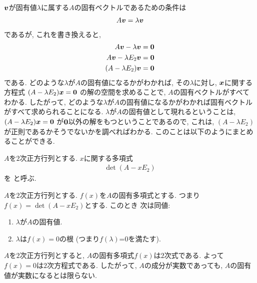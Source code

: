 $\boldsymbol{v}$が固有値$\lambda$に属する$A$の固有ベクトルであるための条件は
\begin{align*}
  A\boldsymbol{v}=\lambda\boldsymbol{v}
\end{align*}
であるが,
これを書き換えると,
\begin{align*}
  A\boldsymbol{v}-\lambda\boldsymbol{v}&=\boldsymbol{0}\\
  A\boldsymbol{v}-\lambda E_2 \boldsymbol{v}&=\boldsymbol{0}\\
  (A-\lambda E_2) \boldsymbol{v}&=\boldsymbol{0}
\end{align*}
である.
どのような$\lambda$が$A$の固有値になるかがわかれば,
その$\lambda$に対し,
$\boldsymbol{x}$に関する方程式
$(A-\lambda E_2) \boldsymbol{x}=\boldsymbol{0}$
の解の空間を求めることで,
$A$の固有ベクトルがすべてわかる.
したがって,
どのような$\lambda$が$A$の固有値になるかがわかれば固有ベクトルがすべて求められることになる.
$\lambda$が$A$の固有値として現れるということは,
$(A-\lambda E_2) \boldsymbol{x}=\boldsymbol{0}$
が$\boldsymbol{0}$以外の解をもつということであるので,
これは, $(A-\lambda E_2)$が正則であるかそうでないかを調べればわかる.
このことは以下のようにまとめることができる.
\begin{definition}
  \label{def:charpoly}
  $A$を$2$次正方行列とする.
  $x$に関する多項式
  \begin{align*}
  \det(A-xE_2)
  \end{align*}
  を
  と呼ぶ.
\end{definition}
\begin{prop}
  $A$を$2$次正方行列とする.
  $f(x)$を$A$の固有多項式とする.
  つまり $f(x)=\det(A-xE_2)$とする.
  このとき 次は同値:
  \begin{enumerate}
  \item $\lambda$が$A$の固有値.
  \item $\lambda$は$f(x)=0$の根 (つまり$f(\lambda)$=0を満たす).
  \end{enumerate}
\end{prop}

\begin{remark}
  $A$を$2$次正方行列とすると, $A$の固有多項式$f(x)$は$2$次式である.
  よって$f(x)=0$は$2$次方程式である.
  したがって, $A$の成分が実数であっても,
  $A$の固有値が実数になるとは限らない.
\end{remark}

